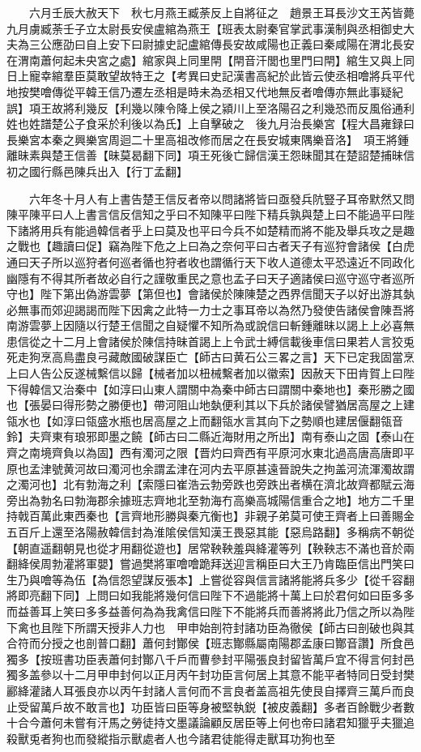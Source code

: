 　　六月壬辰大赦天下　秋七月燕王臧荼反上自將征之　趙景王耳長沙文王芮皆薨　九月虜臧荼壬子立太尉長安侯盧綰為燕王【班表太尉秦官掌武事漢制與丞相御史大夫為三公應劭曰自上安下曰尉據史記盧綰傳長安故咸陽也正義曰秦咸陽在渭北長安在渭南蕭何起未央宮之處】綰家與上同里閈【閈音汗閭也里門曰閈】綰生又與上同日上寵幸綰羣臣莫敢望故特王之【考異曰史記漢書高紀於此皆云使丞相噲將兵平代地按樊噲傳從平韓王信乃遷左丞相是時未為丞相又代地無反者噲傳亦無此事疑紀誤】項王故將利幾反【利幾以陳令降上侯之潁川上至洛陽召之利幾恐而反風俗通利姓也姓譜楚公子食采於利後以為氏】上自擊破之　後九月治長樂宮【程大昌雍録曰長樂宮本秦之興樂宮周迴二十里高祖改修而居之在長安城東隅樂音洛】　項王將鍾離昧素與楚王信善【昧莫曷翻下同】項王死後亡歸信漢王怨昧聞其在楚詔楚捕昧信初之國行縣邑陳兵出入【行丁孟翻】

　　六年冬十月人有上書告楚王信反者帝以問諸將皆曰亟發兵阬豎子耳帝默然又問陳平陳平曰人上書言信反信知之乎曰不知陳平曰陛下精兵孰與楚上曰不能過平曰陛下諸將用兵有能過韓信者乎上曰莫及也平曰今兵不如楚精而將不能及舉兵攻之是趣之戰也【趣讀曰促】竊為陛下危之上曰為之奈何平曰古者天子有巡狩會諸侯【白虎通曰天子所以巡狩者何巡者循也狩者收也謂循行天下收人道德太平恐遠近不同政化幽隱有不得其所者故必自行之謹敬重民之意也孟子曰天子適諸侯曰巡守巡守者巡所守也】陛下第出偽游雲夢【第但也】會諸侯於陳陳楚之西界信聞天子以好出游其埶必無事而郊迎謁謁而陛下因禽之此特一力士之事耳帝以為然乃發使告諸侯會陳吾將南游雲夢上因隨以行楚王信聞之自疑懼不知所為或說信曰斬鍾離昧以謁上上必喜無患信從之十二月上會諸侯於陳信持昧首謁上上令武士縛信載後車信曰果若人言狡兎死走狗烹高鳥盡良弓藏敵國破謀臣亡【師古曰黄石公三畧之言】天下已定我固當烹上曰人告公反遂械繫信以歸【械者加以杻械繫者加以徽索】因赦天下田肯賀上曰陛下得韓信又治秦中【如淳曰山東人謂關中為秦中師古曰謂關中秦地也】秦形勝之國也【張晏曰得形勢之勝便也】帶河阻山地埶便利其以下兵於諸侯譬猶居高屋之上建瓴水也【如淳曰瓴盛水瓶也居高屋之上而翻瓴水言其向下之勢順也建居偃翻瓴音鈴】夫齊東有琅邪即墨之饒【師古曰二縣近海財用之所出】南有泰山之固【泰山在齊之南境齊負以為固】西有濁河之限【晋灼曰齊西有平原河水東北過高唐高唐即平原也孟津號黄河故曰濁河也余謂孟津在河内去平原甚遠晉說失之拘盖河流渾濁故謂之濁河也】北有勃海之利【索隱曰崔浩云勃旁跌也旁跌出者横在濟北故齊都賦云海旁出為勃名曰勃海郡余據班志齊地北至勃海冇高樂高城陽信重合之地】地方二千里持戟百萬此東西秦也【言齊地形勝與秦亢衡也】非親子弟莫可使王齊者上曰善賜金五百斤上還至洛陽赦韓信封為淮隂侯信知漢王畏惡其能【惡烏路翻】多稱病不朝從【朝直遥翻朝見也從才用翻從遊也】居常鞅鞅羞與絳灌等列【鞅鞅志不滿也音於兩翻絳侯周勃灌將軍嬰】嘗過樊將軍噲噲跪拜送迎言稱臣曰大王乃肯臨臣信出門笑曰生乃與噲等為伍【為信怨望謀反張本】上嘗從容與信言諸將能將兵多少【從千容翻將即亮翻下同】上問曰如我能將幾何信曰陛下不過能將十萬上曰於君何如曰臣多多而益善耳上笑曰多多益善何為為我禽信曰陛下不能將兵而善將將此乃信之所以為陛下禽也且陛下所謂天授非人力也　甲申始剖符封諸功臣為徹侯【師古曰剖破也與其合符而分授之也剖普口翻】蕭何封酇侯【班志酇縣屬南陽郡孟康曰酇音讚】所食邑獨多【按班書功臣表蕭何封酇八千戶而曹參封平陽張良封留皆萬戶宜不得言何封邑獨多盖參以十二月甲申封何以正月丙午封功臣言何居上其意不能平者特同日受封樊酈絳灌諸人耳張良亦以丙午封諸人言何而不言良者盖高祖先使艮自擇齊三萬戶而良止受留萬戶故不敢言也】功臣皆曰臣等身被堅執鋭【被皮義翻】多者百餘戰少者數十合今蕭何未嘗有汗馬之勞徒持文墨議論顧反居臣等上何也帝曰諸君知獵乎夫獵追殺獸兎者狗也而發縱指示獸處者人也今諸君徒能得走獸耳功狗也至